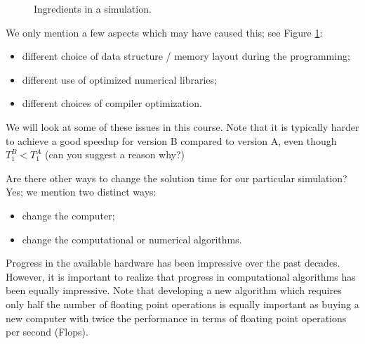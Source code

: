 \begin{figure}
  \centering
  \caption{Ingredients in a simulation.}
  \label{fig:single}
\end{figure}

We only mention a few aspects which may have caused this; see Figure \ref{fig:single}:
\begin{itemize}
\item different choice of data structure / memory layout during the programming;
\item different use of optimized numerical libraries;
\item different choices of compiler optimization.
\end{itemize}
We will look at some of these issues in this course.
Note that it is typically harder to achieve a good speedup for version B compared to
version A, even though $T_1^B  < T_1^A$ (can you suggest a reason why?)

Are there other ways to change the solution time for our particular simulation?
Yes; we mention two distinct ways:
\begin{itemize}
\item change the computer;
\item change the computational or numerical algorithms.
\end{itemize}
Progress in the available hardware has been impressive over the past decades.
However, it is important to realize that progress in computational algorithms
has been equally impressive. Note that developing a new algorithm which requires
only half the number of floating point operations is equally important as buying
a new computer with twice the performance in terms of floating point operations
per second (Flops).

